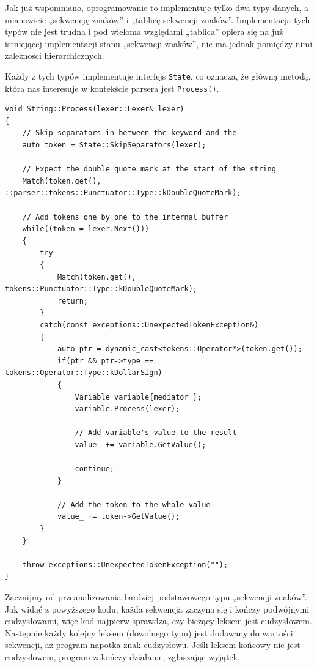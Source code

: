 Jak już wspomniano, oprogramowanie to implementuje tylko dwa typy danych, a mianowicie „sekwencję znaków” i „tablicę sekwencji znaków”. Implementacja tych typów nie jest trudna i pod wieloma względami „tablica” opiera się na już istniejącej implementacji stanu „sekwencji znaków”, nie ma jednak pomiędzy nimi zależności hierarchicznych.

Każdy z tych typów implementuje interfejs \texttt{State}, co oznacza, że główną metodą, która nas interesuje w kontekście parsera jest \texttt{Process()}.

\begin{lstlisting}[label=list:string,caption=Metoda String::Process(),basicstyle=\footnotesize\ttfamily]
void String::Process(lexer::Lexer& lexer)
{
    // Skip separators in between the keyword and the
    auto token = State::SkipSeparators(lexer);

    // Expect the double quote mark at the start of the string
    Match(token.get(), ::parser::tokens::Punctuator::Type::kDoubleQuoteMark);
    
    // Add tokens one by one to the internal buffer
    while((token = lexer.Next()))
    {
        try
        {
            Match(token.get(), tokens::Punctuator::Type::kDoubleQuoteMark);
            return;
        }
        catch(const exceptions::UnexpectedTokenException&)
        {
            auto ptr = dynamic_cast<tokens::Operator*>(token.get());
            if(ptr && ptr->type == tokens::Operator::Type::kDollarSign)
            {
                Variable variable{mediator_};
                variable.Process(lexer);
    
                // Add variable's value to the result
                value_ += variable.GetValue();
    
                continue;
            }
    
            // Add the token to the whole value
            value_ += token->GetValue();
        }
    }
    
    throw exceptions::UnexpectedTokenException("");
}
\end{lstlisting}

Zacznijmy od przeanalizowania bardziej podstawowego typu „sekwencji znaków”. Jak widać z powyższego kodu, każda sekwencja zaczyna się i kończy podwójnymi cudzysłowami, więc kod najpierw sprawdza, czy bieżący leksem jest cudzysłowem. Następnie każdy kolejny leksem (dowolnego typu) jest dodawany do wartości sekwencji, aż program napotka znak cudzysłowu. Jeśli leksem końcowy nie jest cudzysłowem, program zakończy działanie, zgłaszając wyjątek.


